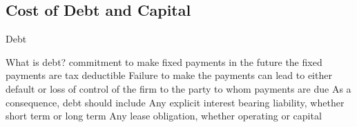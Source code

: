 \documentclass[10pt]{article}
\begin{document}
  \subsection{Cost of Debt and Capital}

    \begin{core}{Debt}

      What is debt?
      commitment to make fixed payments in the future
      the fixed payments are tax deductible
      Failure to make the payments can lead to either default or loss of control of the firm to the party to whom payments are due
      As a consequence, debt should include
      Any explicit interest bearing liability, whether short term or long term
      Any lease obligation, whether operating or capital

    \end{core}
\end{document}
